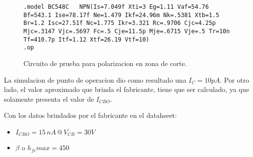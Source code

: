     \begin{figure}[!ht]
      \centering
      \begin{minipage}{0.45\textwidth}
        \caption{Circuito de prueba para polarizacion en zona de corte.}
        \label{crkt:corte}
      \end{minipage}
      \hfill
      \begin{minipage}{0.45\textwidth}
        \begin{lstlisting}[style=ltspice, caption={Parámetros de simulación LTspice}, label=list:corte]
.model BC548C   NPN(Is=7.049f Xti=3 Eg=1.11 Vaf=54.76 Bf=543.1 Ise=78.17f Ne=1.479 Ikf=24.96m Nk=.5381 Xtb=1.5 Br=1.2 Isc=27.51f Nc=1.775 Ikr=3.321 Rc=.9706 Cjc=4.25p Mjc=.3147 Vjc=.5697 Fc=.5 Cje=11.5p Mje=.6715 Vje=.5 Tr=10n Tf=410.7p Itf=1.12 Xtf=26.19 Vtf=10)
.op
        \end{lstlisting}
      \end{minipage}
    \end{figure}

    La simulacion de punto de operacion dio como resultado una $I_C = 10pA$. Por otro lado, el
    valor aproximado que brinda el fabricante, tiene que ser calculado, ya que solamente presenta el valor de $I_{CBO}$.

    Con los datos brindados por el fabricante en el datahseet:
    \begin{itemize}
      \item $I_{CBO}=15 \, nA \, @ \, V_{CB} = 30V$
      \item $\beta$ o $h_{fe}max = 450$
    \end{itemize}

